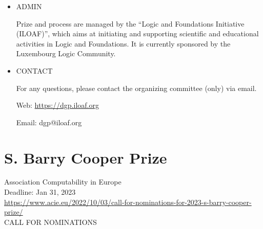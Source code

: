 \documentclass[prodmode,acmtecs]{acmsmall} %
\begin{document}
\begin{itemize}
\item  ADMIN 
 
  Prize and process are managed by the ``Logic and Foundations Initiative (ILOAF)'', which aims at initiating and supporting scientific and educational activities in Logic and Foundations. It is currently sponsored by the Luxembourg Logic Community. 
 
\item  CONTACT 
 
  For any questions, please contact the organizing committee (only) via email. 
 
  Web: \href{https://dgp.iloaf.org}{https://dgp.iloaf.org}  
 
  Email: dgp@iloaf.org 
 
\end{itemize}\section{S. Barry Cooper Prize}\label{SBarryCooperPrize}  Association Computability in Europe\\ 
  Deadline: Jan 31, 2023\\ 
  \href{https://www.acie.eu/2022/10/03/call-for-nominations-for-2023-s-barry-cooper-prize/}{https://www.acie.eu/2022/10/03/call-for-nominations-for-2023-s-barry-cooper-prize/}\\ 
CALL FOR NOMINATIONS 
\end{document}

